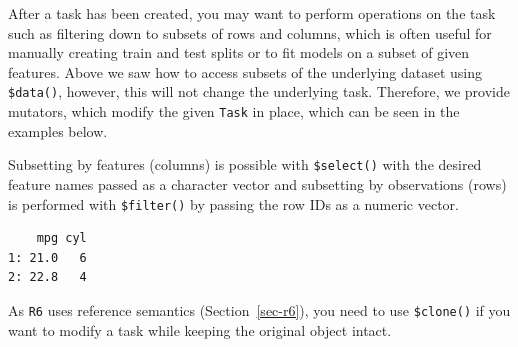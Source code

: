 After a task has been created, you may want to perform operations on the
task such as filtering down to subsets of rows and columns, which is
often useful for manually creating train and test splits or to fit
models on a subset of given features. Above we saw how to access subsets
of the underlying dataset using \texttt{\$data()}, however, this will
not change the underlying task. Therefore, we provide
mutators,
which modify the given \texttt{Task} in place, which can be seen in the
examples below.

Subsetting by features (columns) is possible with \texttt{\$select()}
with the desired feature names passed as a character vector and
subsetting by observations (rows) is performed with \texttt{\$filter()}
by passing the row IDs as a numeric vector.

\begin{Shaded}
\begin{Highlighting}[]
\OtherTok{=} \NormalTok{(}\NormalTok{) }
\SpecialCharTok{$}\NormalTok{(}\NormalTok{) }
\SpecialCharTok{$}\NormalTok{(}\SpecialCharTok{:}\NormalTok{) }
\SpecialCharTok{$}\NormalTok{()}
\end{Highlighting}
\end{Shaded}

\begin{verbatim}
    mpg cyl
1: 21.0   6
2: 22.8   4
\end{verbatim}

As \texttt{R6} uses reference semantics (Section~\ref{sec-r6}), you need
to use \texttt{\$clone()} if you want to modify a task while keeping the
original object intact.

\begin{Shaded}
\begin{Highlighting}[]
\OtherTok{=} \NormalTok{(}\NormalTok{)}
\OtherTok{=}
\SpecialCharTok{$}\NormalTok{(}\SpecialCharTok{:}\NormalTok{)}
\SpecialCharTok{$}\NormalTok{()}
\end{Highlighting}
\end{Shaded}

